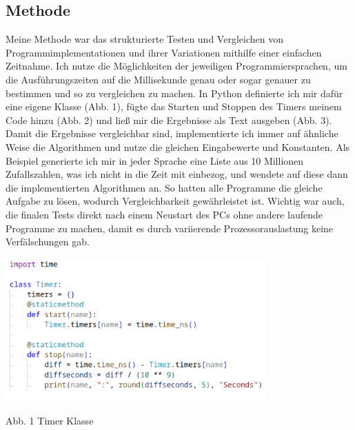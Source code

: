 \documentclass[10pt,a4paper]{article}
\begin{document}
\subsection{Methode}

Meine Methode war das strukturierte Testen und Vergleichen von Programmimplementationen und ihrer 
Variationen mithilfe einer einfachen Zeitnahme. Ich nutze die Möglichkeiten der jeweiligen Programmiersprachen, 
um die Ausführungszeiten auf die Millisekunde genau oder sogar genauer zu bestimmen und 
so zu vergleichen zu machen. In Python definierte ich mir dafür eine eigene Klasse (Abb. 1), fügte das Starten und Stoppen
des Timers meinem Code hinzu (Abb. 2) und ließ mir die Ergebnisse als Text ausgeben (Abb. 3).
Damit die Ergebnisse vergleichbar sind, implementierte ich immer auf ähnliche Weise die Algorithmen und
nutze die gleichen Eingabewerte und Konstanten.
Als Beispiel generierte ich mir in jeder Sprache eine Liste aus 10 Millionen Zufallszahlen,
was ich nicht in die Zeit mit einbezog, und wendete auf diese dann die implementierten Algorithmen an.
So hatten alle Programme die gleiche Aufgabe zu lösen, wodurch Vergleichbarkeit gewährleistet ist.
Wichtig war auch, die finalen Tests direkt nach einem Neustart des PCs ohne andere laufende Programme
zu machen, damit es durch variierende Prozessorauslastung keine Verfälschungen gab. 

    

\begin{center}
    \includegraphics[width=0.75\textwidth]{screenshots/pythontimerlight.png}
    
    Abb. 1 Timer Klasse
\end{center}
\end{document}
